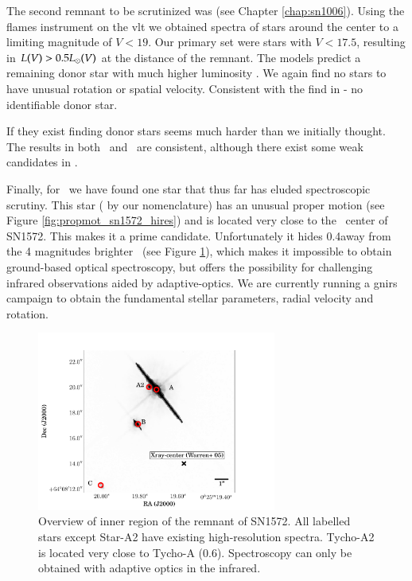 The second remnant to be scrutinized was  (see Chapter \ref{chap:sn1006}). Using the \gls{flames} instrument on the \gls{vlt} we obtained spectra of stars around the center to a limiting magnitude of $V<19$. Our primary set were stars with $V<17.5$, resulting in $L(V) > 0.5\hbox{$L_{\odot}$}(V)$ at the distance of the remnant. The models predict a remaining \gls{donor} star with much higher luminosity \cite[10--100\lsun][]{2000ApJS..128..615M}.
We again find no stars to have unusual rotation or spatial velocity. Consistent with the find in  - no identifiable \gls{donor} star.

If they exist finding donor stars seems much harder than we initially thought. The results in both \ and \ are consistent, although there exist some weak candidates in .

Finally, for \ we have found one star that thus far has eluded spectroscopic scrutiny. This star ( by our nomenclature) has an unusual proper motion (see Figure \vref{fig:propmot_sn1572_hires}) and is located very close to the \xray\ center of SN1572. This makes it a prime candidate. Unfortunately it hides 0.4\arcsec away from the 4 magnitudes brighter \stara\ (see Figure \ref{fig:stara2_overview}), which makes it impossible to obtain ground-based optical spectroscopy, but offers the possibility for challenging infrared observations aided by adaptive-optics. We are currently running a \gls{gnirs} campaign to obtain the fundamental stellar parameters, radial velocity and rotation. 

\begin{figure}[tb] %
   \centering
   \includegraphics[width=0.7\textwidth]{chapter_conclusion/plots/overview_sn1572_a2.pdf} 
   \caption[Close-up of the inner region of SN 1572 with candidates]{Overview of inner region of the remnant of SN1572. All labelled stars except Star-A2 have existing high-resolution spectra. Tycho-A2 is located very close to Tycho-A (0.6\arcsec). Spectroscopy can only be obtained with adaptive optics in the infrared.}
   \label{fig:stara2_overview}
\end{figure}

